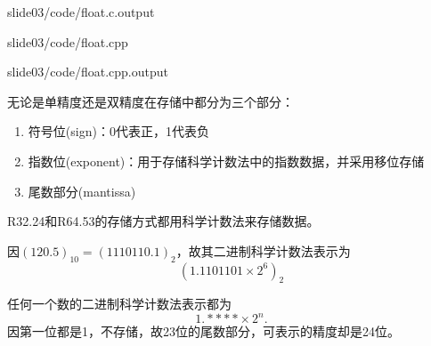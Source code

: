 \begin{frame}[fragile]{\secname}
    
  {slide03/code/float.c.output} 
\end{frame}

\begin{frame}{\secname}
  
  {slide03/code/float.cpp} 
  \end{frame}

  \begin{frame}[fragile]{\secname}
    
  {slide03/code/float.cpp.output} 
\end{frame}
\begin{frame}
无论是单精度还是双精度在存储中都分为三个部分：

\begin{enumerate}
\item
符号位(sign)：0代表正，1代表负\\[0.1in]
\item 
指数位(exponent)：用于存储科学计数法中的指数数据，并采用移位存储\\[0.1in]
\item 
尾数部分(mantissa)
\end{enumerate}
\end{frame}
% 
% 
\begin{frame}
R32.24和R64.53的存储方式都用科学计数法来存储数据。

\begin{free}[例]{}
  因$(120.5)_{10} = (1110110.1)_2$，故其二进制科学计数法表示为
  $$
  (1.1101101\times 2^6)_2
  $$
\end{free}


\pause 
\begin{free}[注]{}
任何一个数的二进制科学计数法表示都为
$$
1.****\times 2^n.
$$
因第一位都是1，不存储，故23位的尾数部分，可表示的精度却是24位。   
\end{free}
\end{frame}
